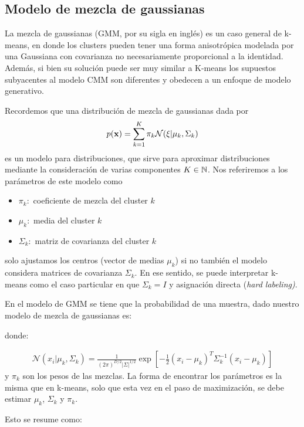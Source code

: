 \subsection{Modelo de mezcla de gaussianas}

La mezcla de gaussianas (GMM, por su sigla en inglés) es un caso general de k-means, en donde los clusters pueden tener una forma anisotrópica modelada por una Gaussiana con covarianza no necesariamente proporcional a la identidad. Además, si bien su solución puede ser muy similar a K-means los supuestos subyacentes al modelo CMM son diferentes y obedecen a un enfoque de modelo generativo. 

Recordemos que una distribución de mezcla de gaussianas dada por 
\begin{align}
p(\mathbf{x}) = \sum_{k=1}^K \pi_k \mathcal{N}(\xi| \mu_k,\Sigma_k)
\end{align}
es un modelo para distribuciones, que sirve para aproximar distribuciones mediante la consideración de varias componentes $K\in{\mathbb N}$. Nos referiremos a los parámetros de este modelo como 

\begin{itemize}
	\item $\pi_k:$ coeficiente de mezcla del cluster  $k$
	\item $\mu_k:$ media del cluster  $k$
	\item $\Sigma_k:$ matriz de covarianza del cluster  $k$
\end{itemize}


solo ajustamos los centros (vector de medias $\mu_k$) si no también el modelo considera matrices de covarianza $\Sigma_k$. En ese sentido, se puede interpretar k-means como el caso particular en que $\Sigma_k = I$ y asignación directa (\emph{hard labeling)}.

En el modelo de GMM se tiene que la probabilidad de una muestra, dado nuestro modelo de mezcla de gaussianas es:


donde:

\begin{align}
\mathcal{N}(x_i| \mu_k,\Sigma_k) = \frac{1}{(2\pi)^{D/2}|\Sigma|^{1/2}}\exp \left[ -\frac{1}{2}(x_i-\mu_k)^T \Sigma_k^{-1}(x_i-\mu_k) \right]
\end{align}
y $\pi_k$ son los pesos de las mezclas. La forma de encontrar los parámetros es la misma que en k-means, solo que esta vez en el paso de maximización, se debe estimar $\mu_k$, $\Sigma_k$ y $\pi_k$.

Esto se resume como:

